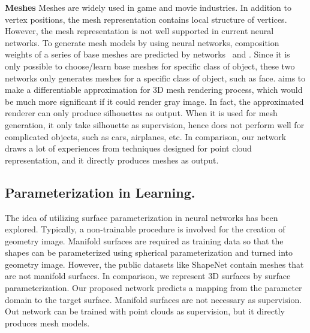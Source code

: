

\noindent\textbf{Meshes}
Meshes are widely used in game and movie industries. 
In addition to vertex positions, the mesh representation contains local structure of vertices. 
However, the mesh representation is not well supported in current neural networks.
% 
To generate mesh models by using neural networks, composition weights of a series of base meshes are predicted by networks~\cite{img2mesh} and \cite{endface}. %
Since it is only possible to choose/learn base meshes for specific class of object, these two networks only generates meshes for a specific class of object, such as face.
%
\cite{3Drender} aims to make a differentiable approximation for 3D mesh rendering process, which would be much more significant if it could render gray image. 
In fact, the approximated renderer can only produce silhouettes as output. 
When it is used for mesh generation, it only take silhouette as supervision, hence does not perform well for complicated objects, such as cars, airplanes, etc.
%
In comparison, our network draws a lot of experiences from techniques designed for point cloud representation, and it directly produces meshes as output.

\subsection{Parameterization in Learning.}
The idea of utilizing surface parameterization in neural networks has been explored\cite{surfnet,geoimg}. 
Typically, a non-trainable procedure is involved for the creation of geometry image. 
Manifold surfaces are required as training data so that the shapes can be parameterized using spherical parameterization and turned into geometry image. However, the public datasets like ShapeNet\cite{shapenetdata} contain meshes that are not manifold surfaces. 
In comparison, we represent 3D surfaces by surface parameterization. 
Our proposed network predicts a mapping from the parameter domain to the target surface. Manifold surfaces are not necessary as supervision.
Out network can be trained with point clouds as supervision, but it directly produces mesh models.
